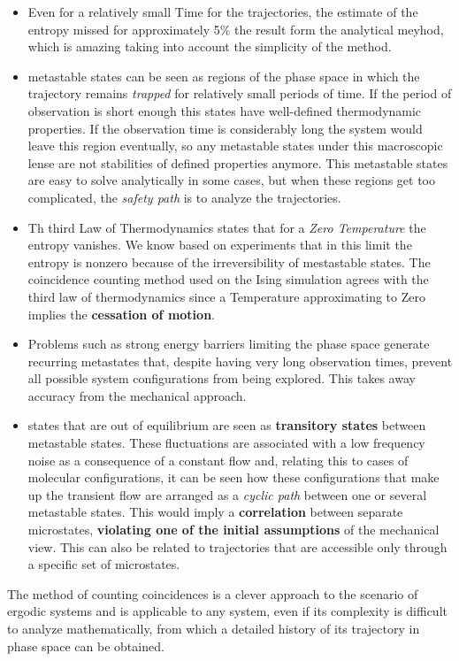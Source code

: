 \documentclass{article}
\begin{document}
\begin{itemize}
    \item Even for a relatively small Time for the trajectories, the estimate of the entropy missed for approximately 5\% the result form the analytical meyhod, which is amazing taking into account the simplicity of the method.
    \item metastable states can be seen as regions of the phase space in which the trajectory remains \textit{trapped} for relatively small periods of time. If the period of observation is short enough this states have well-defined thermodynamic properties. If the observation time is considerably long the system would leave this region eventually, so any metastable states under this macroscopic lense are not stabilities of defined properties anymore. This metastable states are easy to solve analytically in some cases, but when these regions get too complicated, the \textit{safety path} is to analyze the trajectories.
    \item Th third Law of Thermodynamics states that for a \textit{Zero Temperature}  the entropy vanishes. We know based on experiments that in this limit the entropy is nonzero because of the irreversibility of mestastable states. The coincidence counting method used on the Ising simulation agrees with the third law of thermodynamics since a Temperature approximating to Zero implies the \textbf{cessation of motion}. 
    \item Problems such as strong energy barriers limiting the phase space generate recurring metastates that, despite having very long observation times, prevent all possible system configurations from being explored. This takes away accuracy from the mechanical approach.
    \item states that are out of equilibrium are seen as \textbf{transitory states} between metastable states. These fluctuations are associated with a low frequency noise as a consequence of a constant flow and, relating this to cases of molecular configurations, it can be seen how these configurations that make up the transient flow are arranged as a \textit{cyclic path} between one or several metastable states. This would imply a \textbf{correlation} between separate microstates, \textbf{violating one of the initial assumptions} of the mechanical view. This can also be related to trajectories that are accessible only through a specific set of microstates.
\end{itemize}
The method of counting coincidences is a clever approach to the scenario of ergodic systems and is applicable to any system, even if its complexity is difficult to analyze mathematically, from which a detailed history of its trajectory in phase space can be obtained.  
\end{document}

